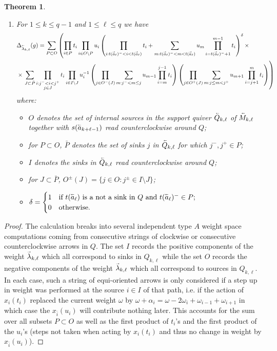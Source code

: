 \documentclass[12pt]{amsart}
\renewcommand{\vec}[1]{\accentset{\shortrightarrow}{#1}}
\newcommand{\cev}[1]{\accentset{\shortleftarrow}{#1}}
\newtheorem{theorem}{Theorem}[section]
\numberwithin{equation}{section}
\begin{document}
{\begin{theorem}
\begin{enumerate}
      \item For $1\le k\le q-1$ and $1\le\ell\le q$  we have
      \begin{align}
        &\Delta_{\cev{\lambda}_{k,\ell}}(g)=\sum_{P\subset O}\left(\prod_{i\in P} t_i\prod_{i\in O\setminus P} u_i\left(\prod_{i:t(\vec{a}_\ell)^-<i<t(\vec{a}_\ell)}t_i+\sum_{m:t(\vec{a}_\ell)^-<m<t(\vec{a}_\ell)}u_m\prod_{i=t(\vec{a}_\ell)^-+1}^{m-1} t_i\right)^\delta\times\right.\\
        \nonumber&\times\left.\sum_{J\subset\bar{P}}\prod_{\substack{i:j^-<i<j^+\\j\in J}}t_i\prod_{i\in I\setminus J}u_i^{-1}\left(\prod_{j\in O^-(J)}\sum_{m:j^-<m\le j}u_{m-1}\prod_{i=m}^{j-1} t_i\right)\left(\prod_{j\in O^+(J)}\sum_{m:j\le m<j^+}u_{m+1}\prod_{i=j+1}^{m} t_i\right)\right)
      \end{align}
      where:
      \begin{itemize}
        \item $O$ denotes the set of internal sources in the support quiver $\cev{Q}_{k,\ell}$ of $\cev{M}_{k,\ell}$ together with $s(\cev{a}_{k+\ell-1})$ read counterclockwise around $Q$;
        \item for $P\subset O$, $\bar{P}$ denotes the set of sinks $j$ in $\cev{Q}_{k,\ell}$ for which $j^-,j^+\in P$;
        \item $I$ denotes the sinks in $\cev{Q}_{k,\ell}$ read counterclockwise around $Q$;
        \item for $J\subset\bar{P}$, $O^\pm(J)=\{j\in O:j^\pm\in I\setminus J\}$;
        \item $\delta=\begin{cases}1 & \text{if $t(\cev{a}_\ell)$ is a not a sink in $Q$ and $t(\cev{a}_\ell)^-\in P$;}\\0 & \text{otherwise.}\end{cases}$
      \end{itemize}
    \end{enumerate}
  \end{theorem}
  \begin{proof}
    The calculation breaks into several independent type $A$ weight space computations coming from consecutive strings of clockwise or consecutive counterclockwise arrows in $Q$.  The set $I$ records the positive components of the weight $\vec{\lambda}_{k,\ell}$ which all correspond to sinks in $Q_{k,\ell}$ while the set $O$ records the negative components of the weight $\vec{\lambda}_{k,\ell}$ which all correspond to sources in $Q_{k,\ell}$.  In each case, such a string of equi-oriented arrows is only considered if a step up in weight was performed at the source $i\in I$ of that path, i.e. if the action of $x_i(t_i)$ replaced the current weight $\omega$ by $\omega+\alpha_i=\omega-2\omega_i+\omega_{i-1}+\omega_{i+1}$ in which case the $x_{\bar{i}}(u_i)$ will contribute nothing later.  This accounts for the sum over all subsets $P\subset O$ as well as the first product of $t_i$'s and the first product of the $u_i$'s (steps not taken when acting by $x_i(t_i)$ and thus no change in weight by $x_{\bar{i}}(u_i)$).


\end{proof}}
\end{document}
